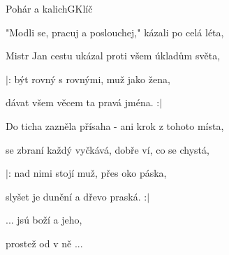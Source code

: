 \begin{song}{Pohár a kalich}{G}{Klíč}
\begin{SBVerse}
"Modli se, pracuj a poslouchej," kázali po celá léta,

Mistr Jan cestu ukázal proti všem úkladům světa,

$|$: být rovný s rovnými, muž jako žena,

   dávat všem věcem ta pravá jména. :$|$

\end{SBVerse}

\begin{SBVerse}

Do ticha zazněla přísaha - ani krok z tohoto místa,

se zbraní každý vyčkává, dobře ví, co se chystá,

$|$: nad nimi stojí muž, přes oko páska,

   slyšet je dunění a dřevo praská. :$|$

\end{SBVerse}

\begin{SBChorus}

... jsú boží  a  jeho,

prostež od   v ně ...

\end{SBChorus}

\end{song}

\clearpage
